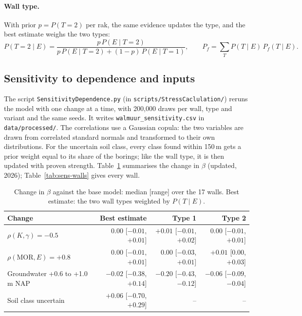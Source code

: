 \paragraph{Wall type.} With prior $p = P(T = 2)$ per rak, the same evidence
updates the type, and the best estimate weighs the two types:
\begin{equation}
P(T = 2 \mid E) = \frac{p\,P(E \mid T=2)}{p\,P(E \mid T=2) + (1-p)\,P(E \mid T=1)},
\qquad
P_f = \sum_{T} P(T \mid E)\,P_f(T \mid E).
\end{equation}

\subsection{Sensitivity to dependence and inputs}\label{app:prob-sensitivity}

The script \texttt{SensitivityDependence.py} (in
\texttt{scripts/StressCaclulation/}) reruns the model with one change at a
time, with 200{,}000 draws per wall, type and variant and the same seeds. It
writes \texttt{walmuur\_sensitivity.csv} in \texttt{data/processed/}. The
correlations use a Gaussian copula: the two variables are drawn from
correlated standard normals and transformed to their own distributions. For
the uncertain soil class, every class found within 150\,m gets a prior weight
equal to its share of the borings; like the wall type, it is then updated
with proven strength. Table~\ref{tab:sens-summary} summarises the change in
$\beta$ (updated, 2026); Table~\ref{tab:sens-walls} gives every wall.

\begin{table}[htbp]
\centering
\small
\caption{Change in $\beta$ against the base model: median [range] over the
17 walls. Best estimate: the two wall types weighted by $P(T \mid E)$.}
\label{tab:sens-summary}
\setlength{\tabcolsep}{4pt}
\begin{tabular}{@{}l r r r@{}}
\toprule
Change & Best estimate & Type 1 & Type 2 \\
\midrule
$\rho(K,\gamma) = -0.5$ & $0.00$ [$-0.01$, $+0.01$] & $+0.01$ [$-0.01$, $+0.02$] & $0.00$ [$-0.01$, $+0.01$] \\
$\rho(\text{MOR},E) = +0.8$ & $0.00$ [$-0.01$, $+0.01$] & $0.00$ [$-0.03$, $+0.01$] & $+0.01$ [$0.00$, $+0.03$] \\
Groundwater +0.6 to +1.0\,m NAP & $-0.02$ [$-0.38$, $+0.14$] & $-0.20$ [$-0.43$, $-0.12$] & $-0.06$ [$-0.09$, $-0.04$] \\
Soil class uncertain & $+0.06$ [$-0.70$, $+0.29$] & -- & -- \\
\bottomrule
\end{tabular}
\end{table}

